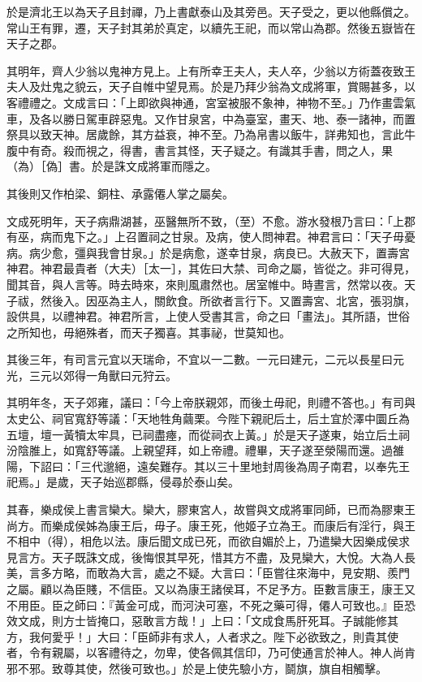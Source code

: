 \begin{pinyinscope}
於是濟北王以為天子且封禪，乃上書獻泰山及其旁邑。天子受之，更以他縣償之。常山王有罪，遷，天子封其弟於真定，以續先王祀，而以常山為郡。然後五嶽皆在天子之郡。

其明年，齊人少翁以鬼神方見上。上有所幸王夫人，夫人卒，少翁以方術蓋夜致王夫人及灶鬼之貌云，天子自帷中望見焉。於是乃拜少翁為文成將軍，賞賜甚多，以客禮禮之。文成言曰：「上即欲與神通，宮室被服不象神，神物不至。」乃作畫雲氣車，及各以勝日駕車辟惡鬼。又作甘泉宮，中為臺室，畫天、地、泰一諸神，而置祭具以致天神。居歲餘，其方益衰，神不至。乃為帛書以飯牛，詳弗知也，言此牛腹中有奇。殺而視之，得書，書言其怪，天子疑之。有識其手書，問之人，果（為）［偽］書。於是誅文成將軍而隱之。

其後則又作柏梁、銅柱、承露僊人掌之屬矣。

文成死明年，天子病鼎湖甚，巫醫無所不致，（至）不愈。游水發根乃言曰：「上郡有巫，病而鬼下之。」上召置祠之甘泉。及病，使人問神君。神君言曰：「天子毋憂病。病少愈，彊與我會甘泉。」於是病愈，遂幸甘泉，病良已。大赦天下，置壽宮神君。神君最貴者（大夫）［太一］，其佐曰大禁、司命之屬，皆從之。非可得見，聞其音，與人言等。時去時來，來則風肅然也。居室帷中。時晝言，然常以夜。天子祓，然後入。因巫為主人，關飲食。所欲者言行下。又置壽宮、北宮，張羽旗，設供具，以禮神君。神君所言，上使人受書其言，命之曰「畫法」。其所語，世俗之所知也，毋絕殊者，而天子獨喜。其事祕，世莫知也。

其後三年，有司言元宜以天瑞命，不宜以一二數。一元曰建元，二元以長星曰元光，三元以郊得一角獸曰元狩云。

其明年冬，天子郊雍，議曰：「今上帝朕親郊，而後土毋祀，則禮不答也。」有司與太史公、祠官寬舒等議：「天地牲角繭栗。今陛下親祀后土，后土宜於澤中圜丘為五壇，壇一黃犢太牢具，已祠盡瘞，而從祠衣上黃。」於是天子遂東，始立后土祠汾陰脽上，如寬舒等議。上親望拜，如上帝禮。禮畢，天子遂至滎陽而還。過雒陽，下詔曰：「三代邈絕，遠矣難存。其以三十里地封周後為周子南君，以奉先王祀焉。」是歲，天子始巡郡縣，侵尋於泰山矣。

其春，樂成侯上書言欒大。欒大，膠東宮人，故嘗與文成將軍同師，已而為膠東王尚方。而樂成侯姊為康王后，毋子。康王死，他姬子立為王。而康后有淫行，與王不相中（得），相危以法。康后聞文成已死，而欲自媚於上，乃遣欒大因樂成侯求見言方。天子既誅文成，後悔恨其早死，惜其方不盡，及見欒大，大悅。大為人長美，言多方略，而敢為大言，處之不疑。大言曰：「臣嘗往來海中，見安期、羨門之屬。顧以為臣賤，不信臣。又以為康王諸侯耳，不足予方。臣數言康王，康王又不用臣。臣之師曰：『黃金可成，而河決可塞，不死之藥可得，僊人可致也。』臣恐效文成，則方士皆掩口，惡敢言方哉！」上曰：「文成食馬肝死耳。子誠能修其方，我何愛乎！」大曰：「臣師非有求人，人者求之。陛下必欲致之，則貴其使者，令有親屬，以客禮待之，勿卑，使各佩其信印，乃可使通言於神人。神人尚肯邪不邪。致尊其使，然後可致也。」於是上使先驗小方，鬬旗，旗自相觸擊。


\end{pinyinscope}

